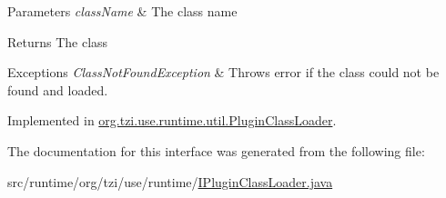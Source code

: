 \begin{DoxyParams}{Parameters}
{\em class\-Name} & The class name \\
\hline
\end{DoxyParams}
\begin{DoxyReturn}{Returns}
The class 
\end{DoxyReturn}

\begin{DoxyExceptions}{Exceptions}
{\em Class\-Not\-Found\-Exception} & Throws error if the class could not be found and loaded. \\
\hline
\end{DoxyExceptions}


Implemented in \hyperlink{classorg_1_1tzi_1_1use_1_1runtime_1_1util_1_1_plugin_class_loader_a6243bd9820cfd2fbd1aa3dc81c5abd7a}{org.\-tzi.\-use.\-runtime.\-util.\-Plugin\-Class\-Loader}.



The documentation for this interface was generated from the following file\-:\begin{DoxyCompactItemize}
\item 
src/runtime/org/tzi/use/runtime/\hyperlink{_i_plugin_class_loader_8java}{I\-Plugin\-Class\-Loader.\-java}\end{DoxyCompactItemize}
